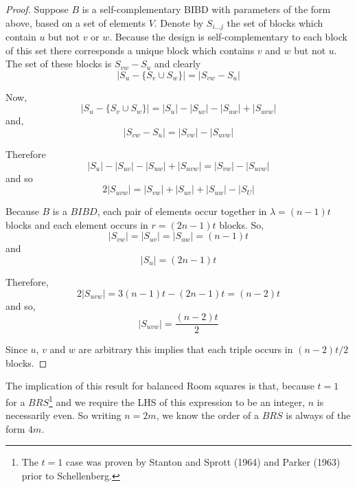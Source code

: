 \documentclass[
  11pt,
  a4paper]{book}
\begin{document}
\begin{proof}
Suppose $B$ is a self-complementary BIBD with parameters
of the form above, based on a set of elements $V$. Denote
by $S_{i\ldots j}$ the set of blocks which contain $u$ but
not $v$ or $w$. Because the design is self-complementary to
each block of this set there corresponds a unique block
which contains $v$ and $w$ but not $u$. The set of these
blocks is $S_{vw} - S_u$ and clearly
\begin{equation}
|S_u - \{S_v \cup S_w\}| = |S_{vw} - S_u|
\end{equation}

Now,
\begin{equation}
|S_u-\{S_v \cup S_w\}| = |S_u| - |S_{uv}| -|S_{uw}| + |S_{uvw}|
\end{equation}
and,
\begin{equation}
|S_{vw} - S_u| = |S_{vw}| - |S_{uvw}|
\end{equation}

Therefore
\begin{equation}
|S_u| - |S_{uv}| -|S_{uw}| + |S_{uvw}| = |S_{vw}| - |S_{uvw}|
\end{equation}
and so
\begin{equation}
2|S_{uvw}| = |S_{vw}| + |S_{uv}| + |S_{uw}| - |S_{U}|
\end{equation}

Because $B$ is a $BIBD$, each pair of elements occur
together in $\lambda = (n - 1)t$ blocks and each element
occurs in $r  =(2n - 1)t$ blocks. So,
\begin{equation}
|S_{vw}| = |S_{uv}| = |S_{uw}| = (n - 1)t
\end{equation}
and
\begin{equation}
|S_u| = (2n - 1)t
\end{equation}

Therefore,
\begin{equation}
2|S_{uvw}| = 3(n - 1)t - (2n  -1)t = (n - 2)t
\end{equation}
and so,
\begin{equation}
|S_{uvw}| = \frac{(n - 2)t}{2}
\end{equation}

Since $u$, $v$ and $w$ are arbitrary this implies that each
triple occurs in $(n - 2)t/2$ blocks.
\end{proof}

The implication of this result for balanced Room squares is that,
because \(t = 1\) for a \(BRS\)\footnote{The \(t=1\) case was proven by
  Stanton and Sprott (1964) and Parker (1963) prior to Schellenberg.}
and we require the LHS of this expression to be an integer, \(n\) is
necessarily even. So writing \(n = 2m\), we know the order of a \(BRS\)
is always of the form \(4m\).
\end{document}
